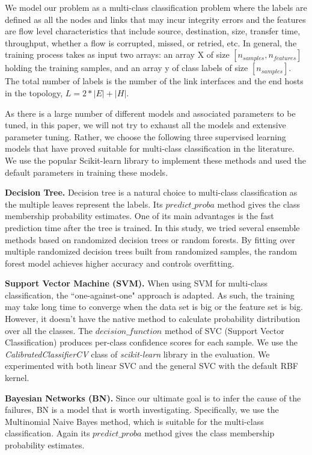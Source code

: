 We model our problem as a multi-class classification problem where the labels are defined as all the nodes and links that may incur integrity errors and the features are flow level characteristics that include source, destination, size, transfer time, throughput, whether a flow is corrupted, missed, or retried, etc. In general, the training process takes as input two arrays: an array X of size $[n_{samples}, n_{features}]$ holding the training samples, and an array y of class labels of size $[n_{samples}]$. The total number of labels is the number of the link interfaces and the end hosts in the topology, $L=2*|E|+|H|$.

As there is a large number of different models and associated parameters to be tuned, in this paper, we will not try to exhaust all the models and extensive parameter tuning. Rather, we choose the following three supervised learning models that have proved suitable for multi-class classification in the literature. We use the popular Scikit-learn library to implement these methods and used the default parameters in training these models. 

{\bf Decision Tree.}  Decision tree is a natural choice to multi-class classification as the multiple leaves represent the labels. Its $predict\_proba$ method gives the class membership probability estimates. One of its main advantages is the fast prediction time after the tree is trained. In this study, we tried several ensemble methods based on randomized decision trees or random forests. By fitting over multiple randomized decision trees built from randomized samples, the random forest model achieves higher accuracy and controls overfitting. 

{\bf Support Vector Machine (SVM).} When using SVM for multi-class classification, the ``one-against-one" approach is adapted. As such, the training may take long time to converge when the data set is big or the feature set is big. However, it doesn't have the native method to calculate probability distribution over all the classes. The $decision\_function$ method of SVC (Support Vector Classification) produces per-class confidence scores for each sample. We use the \emph{CalibratedClassifierCV} class of {\it scikit-learn} library in the evaluation. We experimented with both linear SVC and the general SVC with the default RBF kernel.

{\bf Bayesian Networks (BN).} Since our ultimate goal is to infer the cause of the failures, BN is a model that is worth investigating. Specifically, we use the Multinomial Naive Bayes method, which is suitable for the multi-class classification. Again its $predict\_proba$ method gives the class membership probability estimates.

